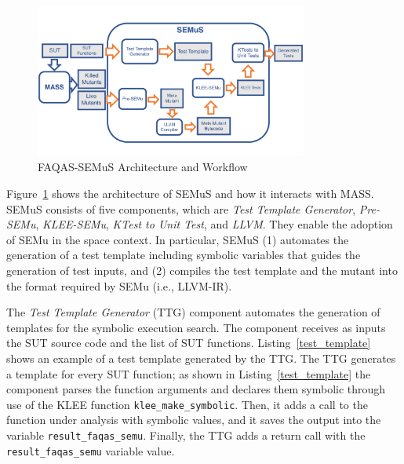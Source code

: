 
\begin{figure}[tb]
\begin{center}
\includegraphics[width=0.8\textwidth]{images/semus-architecture}
\caption{FAQAS-SEMuS Architecture and Workflow}
\label{fig:semus_architecture}
\end{center}
\end{figure}



Figure~\ref{fig:semus_architecture} shows the architecture of SEMuS and how it interacts with MASS. SEMuS consists of five components, which are \emph{Test Template Generator},  \emph{Pre-SEMu},  \emph{KLEE-SEMu},  \emph{KTest to Unit Test}, and \emph{LLVM}.
They enable the adoption of SEMu in the space context. In particular, SEMuS (1) automates the generation of a test template including symbolic variables that guides the generation of test inputs, and (2) compiles the test template and the mutant into the format required by SEMu (i.e., LLVM-IR). 


The \emph{Test Template Generator} (TTG) component automates the generation of templates for the symbolic execution search. The component receives as inputs the SUT source code and the list of SUT functions. 
Listing~\ref{test_template} shows an example of a test template generated by the TTG. The TTG generates a template for every SUT function; as shown in Listing~\ref{test_template} the component parses the function arguments and declares them symbolic through use of the KLEE function \texttt{klee\_make\_symbolic}. Then, it adds a call to the function under analysis with symbolic values, and it saves the output into the variable \texttt{result\_faqas\_semu}. Finally, the TTG adds a return call with the \texttt{result\_faqas\_semu} variable value.

